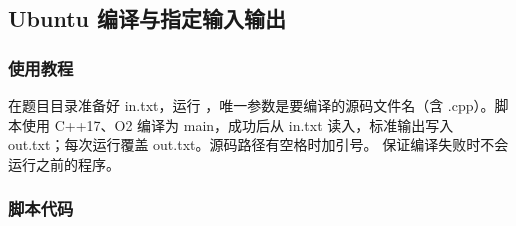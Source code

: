 \subsection{Ubuntu 编译与指定输入输出}
\label{other:run}
\subsubsection*{使用教程}
在题目目录准备好 in.txt，运行 ，唯一参数是要编译的源码文件名（含 .cpp）。脚本使用 C++17、O2 编译为 main，成功后从 in.txt 读入，标准输出写入 out.txt；每次运行覆盖 out.txt。源码路径有空格时加引号。\InlineCode{&&} 保证编译失败时不会运行之前的程序。
\subsubsection*{脚本代码}

